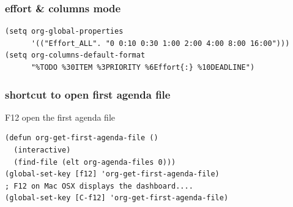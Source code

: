 \documentclass[11pt]{article}
\begin{document}
\subsubsection{effort \& columns mode}
\label{sec:org64e6d54}

\begin{verbatim}
(setq org-global-properties
      '(("Effort_ALL". "0 0:10 0:30 1:00 2:00 4:00 8:00 16:00")))
(setq org-columns-default-format
      "%TODO %30ITEM %3PRIORITY %6Effort{:} %10DEADLINE")
\end{verbatim}

\subsubsection{shortcut to open first agenda file}
\label{sec:org9b3118a}

F12 open the first agenda file

\begin{verbatim}
(defun org-get-first-agenda-file ()
  (interactive)
  (find-file (elt org-agenda-files 0)))
(global-set-key [f12] 'org-get-first-agenda-file)
; F12 on Mac OSX displays the dashboard....
(global-set-key [C-f12] 'org-get-first-agenda-file)
\end{verbatim}
\end{document}
